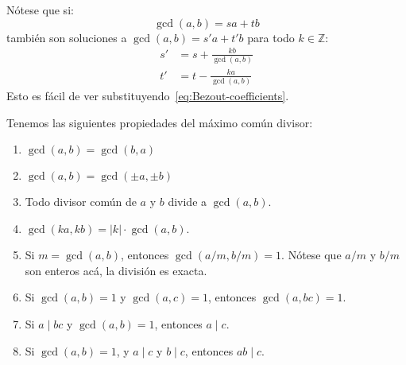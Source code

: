   Nótese que si:
  \begin{equation}
    \label{eq:Bezout}
    \gcd(a, b)
      = s a + t b
  \end{equation}
  también son soluciones a \(\gcd(a, b) = s' a + t' b\)
  para todo \(k \in \mathbb{Z}\):
  \begin{equation}
    \label{eq:Bezout-coefficients}
    \begin{split}
      s' &= s + \frac{k b}{\gcd(a, b)} \\
      t' &= t - \frac{k a}{\gcd(a, b)}
    \end{split}
  \end{equation}
  Esto es fácil de ver substituyendo~\eqref{eq:Bezout-coefficients}.

  \begin{lemma}
    \label{lem:gcd}
    Tenemos las siguientes propiedades del máximo común divisor:
    \begin{enumerate}
    \item
      \label{lem:gcd:conmutativo}
      \(\gcd(a, b) = \gcd(b, a)\)
    \item
      \label{lem:gcd:signos}
      \(\gcd(a, b) = \gcd(\pm a, \pm b)\)
    \item
      \label{lem:gcd:gcd_maximal}
      Todo divisor común de \(a\) y \(b\) divide a \(\gcd(a, b)\).
    \item
      \label{lem:gcd:factor_comun}
      \(\gcd(k a, k b) = \lvert k  \rvert \cdot \gcd(a, b)\).
    \item
      \label{lem:gcd:dividir_gcd}
      Si \(m = \gcd(a, b)\),
      entonces \(\gcd(a / m, b / m) = 1\).
      Nótese que \(a / m\) y \(b / m\) son enteros acá,
      la división es exacta.
    \item
      \label{lem:gcd:producto}
      Si \(\gcd(a, b) = 1\) y \(\gcd(a, c) = 1\),
      entonces \(\gcd(a, b c) = 1\).
    \item
      \label{lem:gcd:divisor}
      Si \(a \mid b c\) y \(\gcd(a, b) = 1\),
      entonces \(a \mid c\).
    \item
      \label{lem:gcd:producto-coprimos-divide}
      Si \(\gcd(a, b) = 1\),
      y \(a \mid c\) y \(b \mid c\),
      entonces \(a b \mid c\).
    \end{enumerate}
  \end{lemma}
